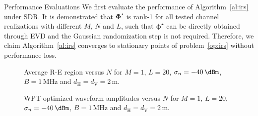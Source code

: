 \documentclass[journal]{IEEEtran}
\begin{document}
\begin{section}{Performance Evaluations}
		We first evaluate the performance of Algorithm~\ref{al:irs} under SDR. It is demonstrated that $\boldsymbol{\Phi}^{\star}$ is rank-\num{1} for all tested channel realizations with different $M$, $N$ and $L$, such that $\boldsymbol{\phi}^{\star}$ can be directly obtained through EVD and the Gaussian randomization step is not required. Therefore, we claim Algorithm~\ref{al:irs} converges to stationary points of problem~\eqref{op:irs} without performance loss.

		\begin{figure}[!t]
			\centering
			\begin{adjustbox}{width=0.9\columnwidth}
				
			\end{adjustbox}
			\caption{Average R-E region versus $N$ for $M=1$, $L=20$, $\sigma_n=-40\,\si{\dBm}$, $B=1\,\si{\MHz}$ and $d_{\mathrm{H}}=d_{\mathrm{V}}=2\,\si{\meter}$.}
			\label{fi:re_subband}
		\end{figure}

		\begin{figure}[!t]
			\centering
			\begin{adjustbox}{width=0.9\columnwidth}
				
			\end{adjustbox}
			\caption{WPT-optimized waveform amplitudes versus $N$ for $M=1$, $L=20$, $\sigma_n=-40\,\si{\dBm}$, $B=1\,\si{\MHz}$ and $d_{\mathrm{H}}=d_{\mathrm{V}}=2\,\si{\meter}$.}
			\label{fi:waveform_subband}
		\end{figure}


\end{section}
\end{document}
